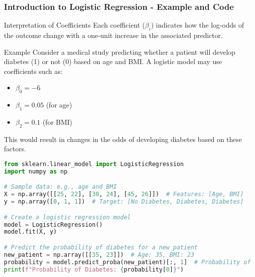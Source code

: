 \documentclass[aspectratio=169]{beamer}
\begin{document}
\begin{frame}[fragile]
    \frametitle{Introduction to Logistic Regression - Example and Code}
    \begin{block}{Interpretation of Coefficients}
        Each coefficient ($\beta_i$) indicates how the log-odds of the outcome change with a one-unit increase in the associated predictor.
    \end{block}

    \begin{block}{Example}
        Consider a medical study predicting whether a patient will develop diabetes (1) or not (0) based on age and BMI. A logistic model may use coefficients such as:
        \begin{itemize}
            \item $\beta_0 = -6$
            \item $\beta_1 = 0.05$ (for age)
            \item $\beta_2 = 0.1$ (for BMI)
        \end{itemize}
        This would result in changes in the odds of developing diabetes based on these factors.
    \end{block}

    \begin{lstlisting}[language=Python]
from sklearn.linear_model import LogisticRegression
import numpy as np

# Sample data: e.g., age and BMI
X = np.array([[25, 22], [30, 24], [45, 26]])  # Features: [Age, BMI]
y = np.array([0, 1, 1])  # Target: [No Diabetes, Diabetes, Diabetes]

# Create a logistic regression model
model = LogisticRegression()
model.fit(X, y)

# Predict the probability of diabetes for a new patient
new_patient = np.array([[35, 23]])  # Age: 35, BMI: 23
probability = model.predict_proba(new_patient)[:, 1]  # Probability of diabetes
print(f"Probability of Diabetes: {probability[0]}")
    \end{lstlisting}
\end{frame}
\end{document}
